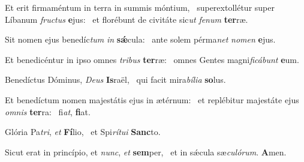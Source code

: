 \item Et erit firmaméntum in terra in summis móntium,~\pscross{} superextollétur super Líbanum \textit{fructus} \textbf{e}jus:~\psstar{} et florébunt de civitáte sic\textit{ut} \textit{fenum} \textbf{ter}ræ.
\item Sit nomen ejus benedíc\textit{tum} \textit{in} \textbf{sǽ}cula:~\psstar{} ante solem pérma\textit{net} \textit{nomen} \textbf{e}jus.
\item Et benedicéntur in ipso omnes \textit{tribus} \textbf{ter}ræ:~\psstar{} omnes Gentes magni\textit{ficábunt} \textbf{e}um.
\item Benedíctus Dóminus, \textit{Deus} \textbf{Is}raël,~\psstar{} qui facit mira\textit{bília} \textbf{so}lus.
\item Et benedíctum nomen majestátis ejus in ætérnum:~\pscross{} et replébitur majestáte ejus \textit{omnis} \textbf{ter}ra:~\psstar{} fi\textit{at}, \textbf{fi}at.
\item Glória Pa\textit{tri}, \textit{et} \textbf{Fí}lio,~\psstar{} et Spi\textit{rítui} \textbf{Sanc}to.
\item Sicut erat in princípio, et \textit{nunc}, \textit{et} \textbf{sem}per,~\psstar{} et in sǽcula sæ\textit{culórum}. \textbf{A}men.
